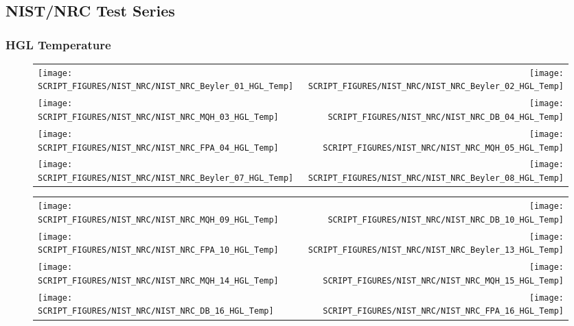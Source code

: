 \clearpage

\subsection{NIST/NRC Test Series}

\subsubsection{HGL Temperature}

\begin{figure}[!ht]
\begin{tabular*}{\textwidth}{l@{\extracolsep{\fill}}r}
\texttt{[image: SCRIPT\_FIGURES/NIST\_NRC/NIST\_NRC\_Beyler\_01\_HGL\_Temp]} &
\texttt{[image: SCRIPT\_FIGURES/NIST\_NRC/NIST\_NRC\_Beyler\_02\_HGL\_Temp]} \\
\texttt{[image: SCRIPT\_FIGURES/NIST\_NRC/NIST\_NRC\_MQH\_03\_HGL\_Temp]} &
\texttt{[image: SCRIPT\_FIGURES/NIST\_NRC/NIST\_NRC\_DB\_04\_HGL\_Temp]} \\
\texttt{[image: SCRIPT\_FIGURES/NIST\_NRC/NIST\_NRC\_FPA\_04\_HGL\_Temp]} &
\texttt{[image: SCRIPT\_FIGURES/NIST\_NRC/NIST\_NRC\_MQH\_05\_HGL\_Temp]} \\
\texttt{[image: SCRIPT\_FIGURES/NIST\_NRC/NIST\_NRC\_Beyler\_07\_HGL\_Temp]} &
\texttt{[image: SCRIPT\_FIGURES/NIST\_NRC/NIST\_NRC\_Beyler\_08\_HGL\_Temp]}
\end{tabular*}
\end{figure}

\begin{figure}[!ht]
\begin{tabular*}{\textwidth}{l@{\extracolsep{\fill}}r}
\texttt{[image: SCRIPT\_FIGURES/NIST\_NRC/NIST\_NRC\_MQH\_09\_HGL\_Temp]} &
\texttt{[image: SCRIPT\_FIGURES/NIST\_NRC/NIST\_NRC\_DB\_10\_HGL\_Temp]} \\
\texttt{[image: SCRIPT\_FIGURES/NIST\_NRC/NIST\_NRC\_FPA\_10\_HGL\_Temp]} &
\texttt{[image: SCRIPT\_FIGURES/NIST\_NRC/NIST\_NRC\_Beyler\_13\_HGL\_Temp]} \\
\texttt{[image: SCRIPT\_FIGURES/NIST\_NRC/NIST\_NRC\_MQH\_14\_HGL\_Temp]} &
\texttt{[image: SCRIPT\_FIGURES/NIST\_NRC/NIST\_NRC\_MQH\_15\_HGL\_Temp]} \\
\texttt{[image: SCRIPT\_FIGURES/NIST\_NRC/NIST\_NRC\_DB\_16\_HGL\_Temp]} &
\texttt{[image: SCRIPT\_FIGURES/NIST\_NRC/NIST\_NRC\_FPA\_16\_HGL\_Temp]}
\end{tabular*}
\end{figure}

